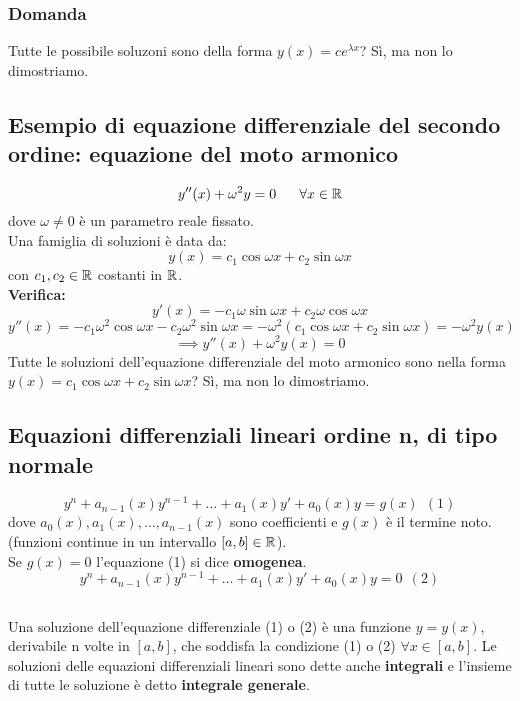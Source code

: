 \documentclass[../main.tex]{subfiles}
\begin{document}
\subsubsection{Domanda}
Tutte le possibile soluzoni sono della forma $y(x) = ce^{\lambda x}$? Sì, ma
non lo dimostriamo.

\subsection{Esempio di equazione differenziale del secondo ordine: equazione del moto armonico}
\[
    y''(x) + \omega^2 y = 0 \ \ \ \ \ \forall x \in \R
\]
dove $\omega \ne 0$ è un parametro reale fissato.\\ Una famiglia di soluzioni è
data da:
\[
    y(x) = c_1\cos{\omega x} + c_2\sin{\omega x}
\]
con $c_1, c_2 \in \mathbb{R}$ costanti in $\mathbb{R}$.\\ \textbf{Verifica:}\\
\[
    y'(x) = -c_1\omega\sin{\omega x} + c_2\omega\cos{\omega x}
\]
\[
    y''(x) = -c_1\omega^2\cos{\omega x} - c_2\omega^2\sin{\omega x} = -\omega^2 (c_1\cos{\omega x} + c_2\sin{\omega x}) = -\omega^2 y(x)
\]
\[
    \implies y''(x) + \omega^2 y(x) = 0
\]
Tutte le soluzioni dell'equazione differenziale del moto armonico sono nella
forma $y(x) = c_1\cos{\omega x} + c_2\sin{\omega x}$? Sì, ma non lo
dimostriamo.

\subsection{Equazioni differenziali lineari ordine n, di tipo normale}
\[
    y^n + a_{n-1}(x)y^{n-1}+\ldots+a_1(x)y'+a_0(x)y = g(x) \ \ (1)
\]
dove $a_0(x), a_1(x), \ldots, a_{n-1}(x)$ sono coefficienti e $g(x)$ è il
termine noto. (funzioni continue in un intervallo $[a, b] \in \mathbb{R}$).\\ Se $g(x)
    = 0$ l'equazione (1) si dice \textbf{omogenea}.
\[
    y^n + a_{n-1}(x)y^{n-1}+\ldots+a_1(x)y'+a_0(x)y = 0 \ \ (2)
\]

\subsection{}
Una soluzione dell'equazione differenziale (1) o (2) è una funzione $y = y(x)$,
derivabile n volte in $[a, b]$, che soddisfa la condizione (1) o (2) $\forall x
    \in [a, b]$. Le soluzioni delle equazioni differenziali lineari sono dette
anche \textbf{integrali} e l'insieme di tutte le soluzione è detto
\textbf{integrale generale}.
\end{document}
